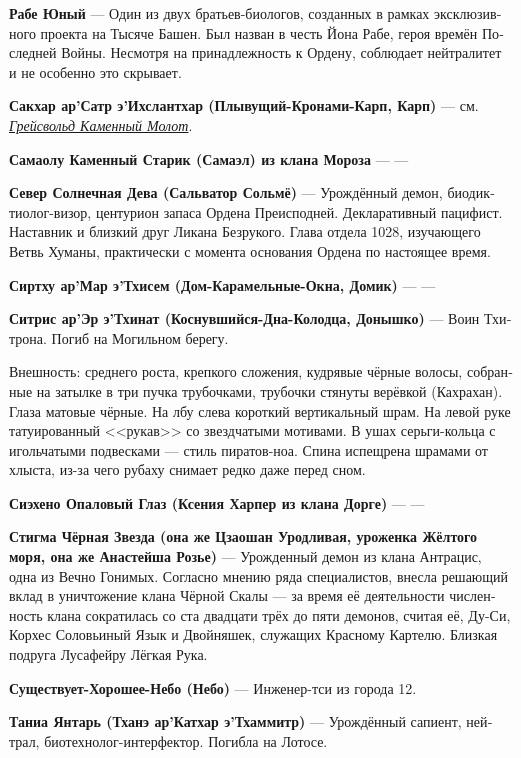 \documentclass[a4paper,12pt,fleqn]{book}\usepackage{polyglossia}\setdefaultlanguage[babelshorthands=true]{russian}\setotherlanguage{english}\defaultfontfeatures{Ligatures=TeX,Mapping=tex-text}\usepackage{xcolor}\newcommand{\ml}[3]{#2}
\newcommand{\theterm}[3]{\textbf{\hypertarget{#1}{#2}} --- #3}
\newcommand{\thesynonim}[3]{\textbf{#2} --- см. \textit{\hyperlink{#1}{#3}}.}
\begin{document}
{\theterm{rabe} %
{Рабе Юный}
{Один из двух братьев-биологов, созданных в рамках эксклюзивного проекта на Тысяче Башен.
Был назван в честь Йона Рабе, героя времён Последней Войны.
Несмотря на принадлежность к Ордену, соблюдает нейтралитет и не особенно это скрывает.}

\thesynonim{grejsvolt}
{Сакхар ар’Сатр э’Ихслантхар (Плывущий-Кронами-Карп, Карп)}
{Грейсвольд Каменный Молот}

\theterm{samajolu}
{Самаолу Каменный Старик (Самаэл) из клана Мороза}
{---}

\theterm{sevjer} %
{Север Солнечная Дева (Сальватор Сольмё)}
{Урождённый демон, биодиктиолог-визор, центурион запаса Ордена Преисподней.
Декларативный пацифист.
Наставник и близкий друг Ликана Безрукого.
Глава отдела 1028, изучающего Ветвь Хуманы, практически с момента основания Ордена по настоящее время.}

\theterm{sirtchu-lechoe}
{Сиртху ар'Мар э'Тхисем (Дом-Карамельные-Окна, Домик)}
{---}

\theterm{sitris}
{Ситрис ар’Эр э’Тхинат (Коснувшийся-Дна-Колодца, Донышко)}
{Воин Тхитрона.
Погиб на Могильном берегу.

Внешность: среднего роста, крепкого сложения, кудрявые чёрные волосы, собранные на затылке в три пучка трубочками, трубочки стянуты верёвкой (Кахрахан).
Глаза матовые чёрные.
На лбу слева короткий вертикальный шрам.
На левой руке татуированный <<рукав>> со звездчатыми мотивами.
В ушах серьги-кольца с игольчатыми подвесками --- стиль пиратов-ноа.
Спина испещрена шрамами от хлыста, из-за чего рубаху снимает редко даже перед сном.}

\theterm{siejeno} %
{Сиэхено Опаловый Глаз (Ксения Харпер из клана Дорге)}
{---}

\theterm{stijma} %
{Стигма Чёрная Звезда (она же Цзаошан Уродливая, уроженка Жёлтого моря, она же Анастейша Розье)}
{Урожденный демон из клана Антрацис, одна из Вечно Гонимых.
Согласно мнению ряда специалистов, внесла решающий вклад в уничтожение клана Чёрной Скалы --- за время её деятельности численность клана сократилась со ста двадцати трёх до пяти демонов, считая её, Ду-Си, Корхес Соловьиный Язык и Двойняшек, служащих Красному Картелю.
Близкая подруга Лусафейру Лёгкая Рука.}

\theterm{sky} %
{Существует-Хорошее-Небо (Небо)}
{Инженер-тси из города 12.}

\theterm{chhanei}
{Таниа Янтарь (Тханэ ар’Катхар э’Тхаммитр)}
{Урождённый сапиент, нейтрал, биотехнолог-интерфектор.
Погибла на Лотосе.

}}
\end{document}
